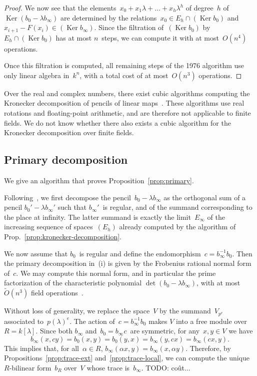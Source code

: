 \documentclass{lms}
\def\todo#1{{\color{orange}TODO: #1}}
\DeclareMathOperator\Ker{Ker}
\def\Ot{\widetilde{O}}
\begin{document}
\begin{proof}
We now see that the elements~$x_0 + x_1 λ + … + x_h λ^h$
of degree~$h$ of~$\Ker(b_0 - λ b_∞)$
are determined by the relations~$x_0 ∈ E_{h} ∩ (\Ker b_0)$
and~$x_{i+1} - F (x_i) ∈ (\Ker b_∞)$.
Since the filtration of~$(\Ker b_0)$ by~$E_{h} ∩ (\Ker b_0)$
has at most $n$~steps, we can compute it with at most~$O(n^4)$ operations.

Once this filtration is computed,
all remaining steps of the 1976 algorithm use only linear algebra in~$k^n$,
with a total cost of at most~$O(n^3)$ operations.
\end{proof}

Over the real and complex numbers,
there exist cubic algorithms computing the Kronecker decomposition
of pencils of linear maps~\cite{beelen1988improved}.
These algorithms use real rotations and floating-point arithmetic,
and are therefore not applicable to finite fields.
We do not know whether there also exists a cubic algorithm
for the Kronecker decomposition over finite fields.


\subsection{Primary decomposition}
\label{ap:primary}

We give an algorithm that proves
Proposition~\ref{prop:primary}.

Following~\cite[Lemma 4.1]{inventiones1976waterhouse},
we first decompose the pencil~$b_0 - λ b_∞$ as the orthogonal sum of
a pencil $b_0' - λ b_∞'$ such that $b_∞'$~is regular,
and of the summand corresponding to the place at infinity.
The latter summand is exactly
the limit~$E_{∞}$ of the increasing sequence of spaces~$(E_{h})$
already computed by the algorithm of Prop.~\ref{prop:kronecker-decomposition}.

We now assume that $b_0$~is regular
and define the endomorphism~$c = b_∞^{-1} b_0$.
Then the primary decomposition in~(i) is given by
the Frobenius rational normal form of~$c$.
We may compute this normal form, and in particular
the prime factorization of the characteristic polynomial $\det (b_0 - λ b_∞)$,
with at most~$\Ot(n^3)$ field operations~\cite{kaltoffen11compute}.

\medbreak

Without loss of generality, we replace the space~$V$
by the summand~$V_{p^e}$ associated to~$p(λ)^e$.
The action of~$c = b_∞^{-1} b_0$ makes $V$ into a free module over~$R = k[λ]$.
Since both $b_∞$ and~$b_0=b_∞ c$~are symmetric, for any~$x, y ∈ V$ we have
\begin{equation}
b_∞(x, c y) = b_0(x, y) = b_0(y, x) = b_∞(y, c x) = b_∞(c x, y).
\end{equation}
This implies that, for all~$α ∈ R$, $b_∞(α x, y) = b_∞(x, α y)$.
Therefore, by Propositions~\ref{prop:trace-ext} and~\ref{prop:trace-local},
we can compute the unique $R$-bilinear form~$b_R$ over~$V$
whose trace is~$b_∞$.
\todo{coût...}
\end{document}
